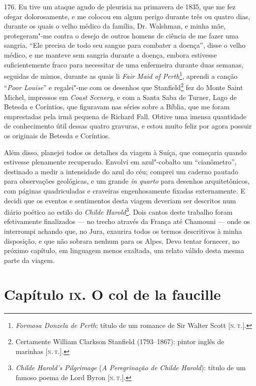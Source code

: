 176. Eu tive um ataque agudo de pleurisia na primavera de 1835, que me
fez ofegar dolorosamente, e me colocou em algum perigo durante três ou
quatro dias, durante os quais o velho médico da família, Dr. Walshman, e
minha mãe, protegeram"-me contra o desejo de outros homens de ciência de
me fazer uma sangria. ``Ele precisa de todo seu sangue para combater a
doença'', disse o velho médico, e me manteve sem sangria durante a
doença, embora estivesse suficientemente fraco para necessitar de uma
enfermeira durante duas semanas, seguidas de mimos, durante as quais li
\emph{Fair} \emph{Maid of Perth}\footnote{\emph{Formosa Donzela de
  Perth}: título de um romance de Sir Walter Scott {[}\textsc{n.\,t.}{]}.},
aprendi a canção ``\emph{Poor Louise}'' e regalei"-me com os desenhos que
Stanfield\footnote{Certamente William Clarkson Stanfield (1793--1867):
  pintor inglês de marinhas {[}\textsc{n.\,t.}{]}.} fez do Monte Saint Michel,
impressos em \emph{Coast Scenery,} e com a Santa Saba de Turner, Lago de
Betesda e Coríntios, que figuravam nas séries sobre a Bíblia, que me
foram emprestadas pela irmã pequena de Richard Fall. Obtive uma imensa
quantidade de conhecimento útil dessas quatro gravuras, e estou muito
feliz por agora possuir os originais de Betesda e Coríntios.

Além disso, planejei todos os detalhes da viagem à Suíça, que começaria
quando estivesse plenamente recuperado. Envolvi em azul"-cobalto um
``cianômetro'', destinado a medir a intensidade do azul do céu; comprei
um caderno pautado para observações geológicas, e um grande \emph{in
quarto} para desenhos arquitetônicos, com páginas quadriculadas e
craveiras engenhosamente fixadas externamente. E decidi que os eventos e
sentimentos desta viagem deveriam ser descritos num diário poético ao
estilo do \emph{Childe Harold}\footnote{\emph{Childe Harold's
  Pilgrimage} (\emph{A Peregrinação de Childe Harold}): título de um
  famoso poema de Lord Byron {[}\textsc{n.\,t.}{]}.}. Dois cantos deste
trabalho foram efetivamente finalizados --- no trecho através da França
até Chamouni --- onde os interrompi achando que, no Jura, exaurira todos
os termos descritivos à minha disposição, e que não sobrara nenhum para
os Alpes. Devo tentar fornecer, no próximo capítulo, em linguagem menos
exaltada, um relato válido desta mesma parte da viagem.

\chapter{Capítulo \textsc{ix}. O col de la faucille}

